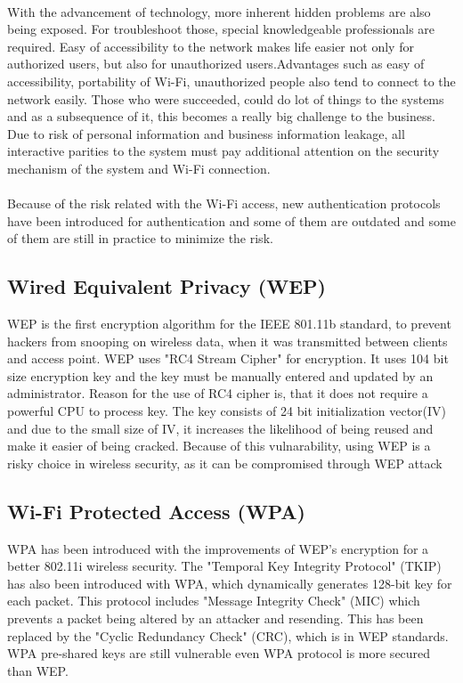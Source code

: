 \paragraph{}
With the advancement of technology, more inherent hidden problems are also being exposed. For troubleshoot those, special knowledgeable professionals are required. Easy of accessibility to the network makes life easier not only for authorized users, but also for unauthorized users.Advantages such as easy  of accessibility, portability of Wi-Fi, unauthorized people also tend to connect to the network easily. Those who were succeeded, could do lot of things to the systems and as a subsequence of it, this becomes a really big challenge to the business. Due to risk of personal information and business information leakage, all interactive parities to the system must pay additional attention on the security mechanism of the system and Wi-Fi connection. 

\paragraph{}
Because of the risk related with the Wi-Fi access, new authentication protocols have been introduced for authentication and some of them are outdated and some of them are still in practice to minimize the risk.

\subsection{Wired Equivalent Privacy (WEP)}
WEP\cite{wep} is the first encryption algorithm for the IEEE 801.11b standard, to prevent hackers from snooping on wireless data, when it was transmitted between clients and access point. WEP uses "RC4 Stream Cipher" for encryption. It uses 104 bit size encryption key and the key must be manually entered and updated by an administrator. Reason for the use of RC4 cipher is, that it does not require a powerful CPU to process key. The key consists of 24 bit initialization vector(IV) and due to the small size of IV, it increases the likelihood of being reused and make it easier of being cracked. Because of this vulnarability, using WEP is a risky choice in wireless security, as it can be compromised through WEP attack\cite{wep_attack}

\subsection{Wi-Fi Protected Access (WPA)} 
WPA\cite{wpa_def_2} has been introduced with the improvements of WEP's encryption for a better 802.11i wireless security. The "Temporal Key Integrity Protocol" (TKIP) has also been introduced with WPA, which dynamically generates 128-bit key for each packet. This protocol includes "Message Integrity Check" (MIC) which prevents a packet being altered by an attacker and resending. This has been replaced by the "Cyclic Redundancy Check" (CRC), which is in WEP standards. WPA pre-shared keys are still vulnerable even WPA protocol is more secured than WEP\cite{wpa_vul}.

